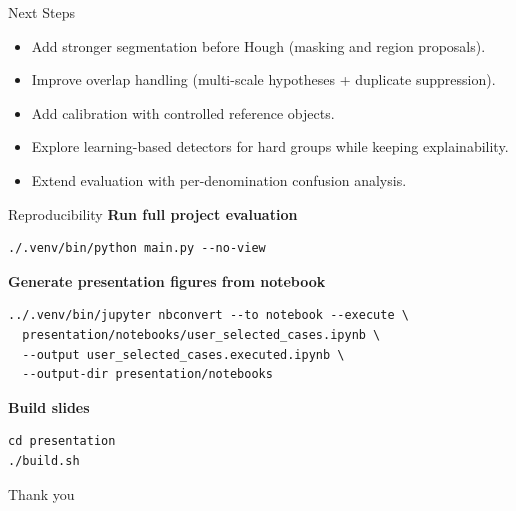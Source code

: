 \documentclass[aspectratio=169]{beamer}
\begin{document}
\begin{frame}{Next Steps}
  \begin{itemize}
    \item Add stronger segmentation before Hough (masking and region proposals).
    \item Improve overlap handling (multi-scale hypotheses + duplicate suppression).
    \item Add calibration with controlled reference objects.
    \item Explore learning-based detectors for hard groups while keeping explainability.
    \item Extend evaluation with per-denomination confusion analysis.
  \end{itemize}
\end{frame}

\begin{frame}[fragile]{Reproducibility}
  \small
  \textbf{Run full project evaluation}
  \begin{verbatim}
./.venv/bin/python main.py --no-view
  \end{verbatim}

  \textbf{Generate presentation figures from notebook}
  \begin{verbatim}
../.venv/bin/jupyter nbconvert --to notebook --execute \
  presentation/notebooks/user_selected_cases.ipynb \
  --output user_selected_cases.executed.ipynb \
  --output-dir presentation/notebooks
  \end{verbatim}

  \textbf{Build slides}
  \begin{verbatim}
cd presentation
./build.sh
  \end{verbatim}
\end{frame}

\begin{frame}
  \centering
  \Large Thank you
\end{frame}
\end{document}
